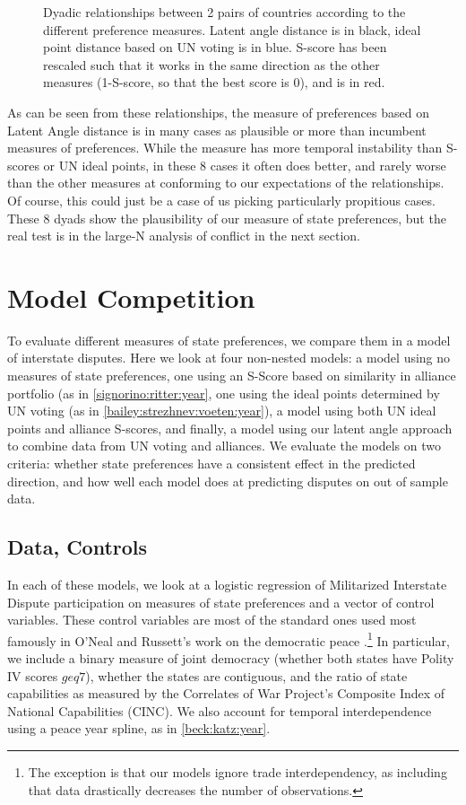 \begin{figure}
\centering
{}
\caption{Dyadic relationships between 2 pairs of countries according to the different preference measures. Latent angle distance is in black, ideal point distance based on UN voting is in blue. S-score has been rescaled such that it works in the same direction as the other measures (1-S-score, so that the best score is 0), and is in red.}
\label{missing:dyads}
\end{figure}

As can be seen from these relationships, the measure of preferences based on Latent Angle distance is in many cases as plausible or more than incumbent measures of preferences. While the measure has more temporal instability than S-scores or UN ideal points, in these 8 cases it often does better, and rarely worse than the other measures at conforming to our expectations of the relationships. Of course, this could just be a case of us picking particularly propitious cases. These 8 dyads show the plausibility of our measure of state preferences, but the real test is in the large-N analysis of conflict in the next section.


\section{Model Competition}
To evaluate different measures of state preferences, we compare them in a model of interstate disputes. Here we look at four non-nested models: a model using no measures of state preferences, one using an S-Score based on similarity in alliance portfolio (as in \ref{signorino:ritter:year}, one using the ideal points determined by UN voting (as in \ref{bailey:strezhnev:voeten:year}), a model using both UN ideal points and alliance S-scores, and finally, a model using our latent angle approach to combine data from UN voting and alliances. We evaluate the models on two criteria: whether state preferences have a consistent effect in the predicted direction, and how well each model does at predicting disputes on out of sample data.

\subsection{Data, Controls}
In each of these models, we look at a logistic regression of Militarized Interstate Dispute participation on measures of state preferences and a vector of control variables. These control variables are most of the standard ones used most famously in O'Neal and Russett's work on the democratic peace \citep{oneal:russett:year}.\footnote{The exception is that our models ignore trade interdependency, as including that data drastically decreases the number of observations.} In particular, we include a binary measure of joint democracy (whether both states have Polity IV scores $geq 7$), whether the states are contiguous, and the ratio of state capabilities as measured by the Correlates of War Project's Composite Index of National Capabilities (CINC). We also account for temporal interdependence using a peace year spline, as in \ref{beck:katz:year}. 

